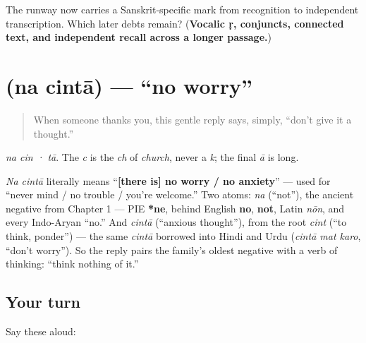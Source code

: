 \begin{tcolorbox}[breakable,colback=teal!4,colframe=teal!35!black,title={Before you move on}]
The runway now carries a Sanskrit-specific mark from recognition to independent transcription. Which later debts remain? (\textbf{Vocalic ṛ, conjuncts, connected text, and independent recall across a longer passage.})
\end{tcolorbox}
\section[\texorpdfstring{\sk{न} \sk{चिन्ता} (na cintā)}{न चिन्ता (na cintā)}]{  (na cintā) — \textquotedblleft{}no worry\textquotedblright{}}

\label{lesson:SA-C03-na-cinta}



\begin{quote}
When someone thanks you, this gentle reply says, simply, \textquotedblleft{}don't give it a thought.\textquotedblright{}
\end{quote}

\begin{sounds}
\emph{na cin · tā}. The \emph{c} is the \emph{ch} of \emph{church}, never a \emph{k}; the final \emph{ā} is long.
\end{sounds}

\begin{cousinweb}
\emph{Na cintā} literally means \textquotedblleft{}\textbf{{[}there is{]} no worry / no anxiety}\textquotedblright{} — used for \textquotedblleft{}never mind / no trouble / you're welcome.\textquotedblright{} Two atoms: \emph{na} (\textquotedblleft{}not\textquotedblright{}), the ancient negative from Chapter 1 — PIE \textbf{*ne}, behind English \textbf{no}, \textbf{not}, Latin \emph{nōn}, and every Indo-Aryan \textquotedblleft{}no.\textquotedblright{} And \emph{cintā} (\textquotedblleft{}anxious thought\textquotedblright{}), from the root \emph{cint} (\textquotedblleft{}to think, ponder\textquotedblright{}) — the same \emph{cintā} borrowed into Hindi and Urdu (\emph{cintā mat karo}, \textquotedblleft{}don't worry\textquotedblright{}). So the reply pairs the family's oldest negative with a verb of thinking: \textquotedblleft{}think nothing of it.\textquotedblright{}
\end{cousinweb}

\subsection*{Your turn}
Say these aloud:

